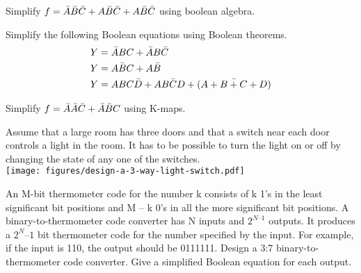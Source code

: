 \begin{example}
  Simplify $f = \bar{A}\bar{B}\bar{C} + A \bar{B}\bar{C} + A\bar{B}\bar{C} $ using boolean algebra.
\end{example}
\vspace{10em}

\begin{prob}
Simplify the following Boolean equations using Boolean theorems.
\begin{align}
 Y &= \bar{A} BC + \bar{A} B\bar{C}\\
Y &= \bar{ABC} + A\bar{B}\\
Y &= ABC\bar{D} + A\bar{BCD} + (\bar{A + B + C + D})
\end{align}
\end{prob}

\begin{example}
  Simplify $f = \bar{A}\bar{A}\bar{C} + \bar{A}\bar{B} C $ using K-maps.
\end{example}
\vspace{10em}


\begin{example}
  Assume that a large room has three doors and that a switch near each door controls a light in the room. It has to be possible to turn the light on or off by changing the state of any one
  of the switches.\\
  \texttt{[image: figures/design-a-3-way-light-switch.pdf]}
\end{example}
\vspace{10em}

\begin{prob}
An M-bit thermometer code for the number k consists of k 1’s in the
least significant bit positions and M – k 0’s in all the more significant bit positions.
A binary-to-thermometer code converter has N inputs and $2^{N–1}$ outputs. It
produces a $2^N–1$ bit thermometer code for the number specified by the input.
For example, if the input is 110, the output should be 0111111. Design a 3:7
binary-to-thermometer code converter. Give a simplified Boolean equation for
each output.
\end{prob}

